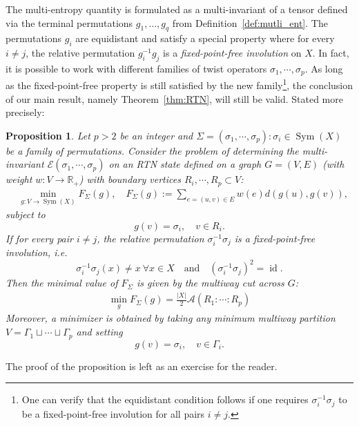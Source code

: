 \documentclass[11pt,oneside,letterpaper]{article}
\numberwithin{equation}{section}
\newtheorem{proposition}[theorem]{Proposition}
\theoremstyle{definition}
\theoremstyle{remark}
\DeclareMathOperator{\id}{id}
\DeclareMathOperator{\Sym}{Sym}
\begin{document}
The multi-entropy quantity is formulated as a multi-invariant of a tensor defined via the terminal permutations $g_1, \ldots, g_q$ from Definition~\ref{def:mutli_ent}. The permutations $g_i$ are equidistant and satisfy a special property where for every $i\ne j$, the relative permutation $g^{-1}_ig_j$ is a \emph{fixed-point-free involution} on $X$.
In fact, it is possible to work with different families of twist operators $\sigma_1,\cdots,\sigma_p$. As long as the fixed-point-free property is still satisfied by the new family\footnote{One can verify that the equidistant condition follows if one requires $\sigma_i^{-1}\sigma_j$ to be a fixed-point-free involution for all pairs $i\ne j$.}, the conclusion of our main result, namely Theorem~\ref{thm:RTN}, will still be valid. Stated more precisely:
\begin{proposition}
  Let $p> 2$ be an integer and $\Sigma=(\sigma_1,\cdots,\sigma_p): \sigma_i\in \Sym(X)$ be a family of permutations. Consider the problem of determining the multi-invariant $\mathcal{E}(\sigma_1,\cdots,\sigma_p)$ on an RTN state defined on a graph $G=(V,E)$ (with weight $w:V\to \mathbb{R}_+$) with boundary vertices $R_i,\cdots,R_p\subset V$:
  \begin{align}
    &\min_{g:V\to \Sym(X)} F_\Sigma(g), \quad  F_\Sigma(g):=\sum_{e=(u,v)\in E} w(e)d(g(u),g(v)),
  \end{align}
  subject to
  \begin{equation}
    g(v) = \sigma_i,\quad v\in R_i.
  \end{equation}
  If for every pair $i\ne j$, the relative permutation $\sigma_i^{-1}\sigma_j$ is a \emph{fixed-point-free involution}, i.e.
  \begin{equation}
    \sigma_i^{-1}\sigma_j(x) \ne x ~\forall x\in X\quad \text{and} \quad (\sigma_i^{-1}\sigma_j)^2 = \id.
  \end{equation}
  Then the minimal value of $F_\Sigma$ is given by the multiway cut across $G$:
  \begin{align}
    \min_g F_\Sigma(g) = \frac{|X|}{2} \mathcal{A}(R_1:\cdots:R_p)
  \end{align}
  Moreover, a minimizer is obtained by taking any minimum multiway partition $V=\Gamma_1\sqcup\cdots \sqcup \Gamma_p$ and setting
  \begin{equation}
    g(v)=\sigma_i, \quad v\in \Gamma_i.
  \end{equation}
\end{proposition}
The proof of the proposition is left as an exercise for the reader.
\end{document}
